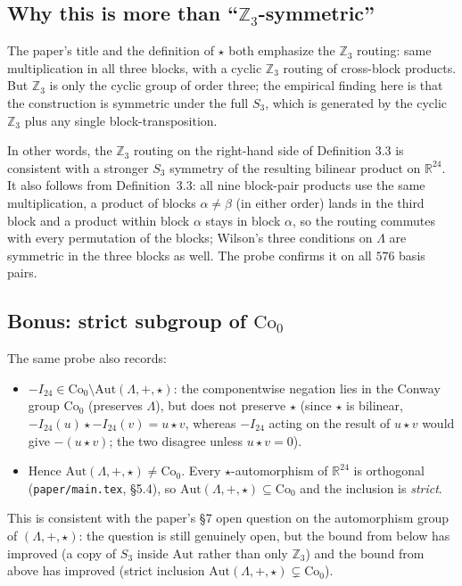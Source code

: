 \documentclass[11pt]{amsart}
\newcommand{\LL}{\Lambda}
\newcommand{\ZZ}{\mathbb{Z}}
\newcommand{\RR}{\mathbb{R}}
\newcommand{\Aut}{\mathrm{Aut}}
\newcommand{\Co}{\mathrm{Co}}
\theoremstyle{remark}
\begin{document}
\subsection*{Why this is more than ``$\ZZ_3$-symmetric''}

The paper's title and the definition of $\star$ both emphasize the
$\ZZ_3$ routing: same multiplication in all three blocks, with a
cyclic $\ZZ_3$ routing of cross-block products.  But $\ZZ_3$ is
only the cyclic group of order three; the empirical finding here
is that the construction is symmetric under the full $S_3$,
which is generated by the cyclic $\ZZ_3$ plus any single
block-transposition.

In other words, the $\ZZ_3$ routing on the right-hand side of
Definition 3.3 is consistent with a stronger $S_3$ symmetry of the
resulting bilinear product on $\RR^{24}$.  It also follows from
Definition~3.3: all nine block-pair products use the same
multiplication, a product of blocks $\alpha \ne \beta$ (in either
order) lands in the third block and a product within block $\alpha$
stays in block $\alpha$, so the routing commutes with every
permutation of the blocks; Wilson's three conditions on $\LL$ are
symmetric in the three blocks as well.  The probe confirms it on all
$576$ basis pairs.

\subsection*{Bonus: strict subgroup of $\Co_0$}

The same probe also records:
\begin{itemize}
\item $-I_{24} \in \Co_0 \setminus \Aut(\LL, +, \star)$: the
  componentwise negation lies in the Conway group $\Co_0$
  (preserves $\LL$), but does not preserve $\star$ (since
  $\star$ is bilinear, $-I_{24}(u) \star -I_{24}(v) = u \star v$,
  whereas $-I_{24}$ acting on the result of $u \star v$ would give
  $-(u \star v)$; the two disagree unless $u \star v = 0$).
\item Hence $\Aut(\LL, +, \star) \ne \Co_0$.  Every
  $\star$-automorphism of $\RR^{24}$ is orthogonal
  (\texttt{paper/main.tex}, \S5.4), so
  $\Aut(\LL, +, \star) \subseteq \Co_0$ and the inclusion is
  \emph{strict}.
\end{itemize}

This is consistent with the paper's \S7 open question on the
automorphism group of $(\LL, +, \star)$: the question is still
genuinely open, but the bound from below has improved (a copy of
$S_3$ inside $\Aut$ rather than only $\ZZ_3$) and the bound from
above has improved (strict inclusion $\Aut(\LL,+,\star) \subsetneq
\Co_0$).
\end{document}
